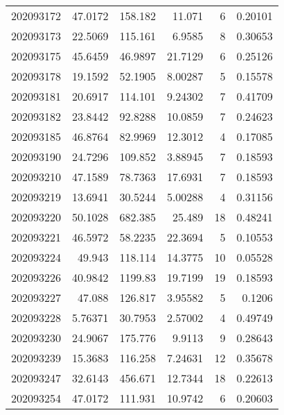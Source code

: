 \begin{tabular}{rrrrrr}
 202093172 &         47.0172  &      158.182  &           11.071   &           6 & 0.20101 \\
 202093173 &         22.5069  &      115.161  &            6.9585  &           8 & 0.30653 \\
 202093175 &         45.6459  &       46.9897 &           21.7129  &           6 & 0.25126 \\
 202093178 &         19.1592  &       52.1905 &            8.00287 &           5 & 0.15578 \\
 202093181 &         20.6917  &      114.101  &            9.24302 &           7 & 0.41709 \\
 202093182 &         23.8442  &       92.8288 &           10.0859  &           7 & 0.24623 \\
 202093185 &         46.8764  &       82.9969 &           12.3012  &           4 & 0.17085 \\
 202093190 &         24.7296  &      109.852  &            3.88945 &           7 & 0.18593 \\
 202093210 &         47.1589  &       78.7363 &           17.6931  &           7 & 0.18593 \\
 202093219 &         13.6941  &       30.5244 &            5.00288 &           4 & 0.31156 \\
 202093220 &         50.1028  &      682.385  &           25.489   &          18 & 0.48241 \\
 202093221 &         46.5972  &       58.2235 &           22.3694  &           5 & 0.10553 \\
 202093224 &         49.943   &      118.114  &           14.3775  &          10 & 0.05528 \\
 202093226 &         40.9842  &     1199.83   &           19.7199  &          19 & 0.18593 \\
 202093227 &         47.088   &      126.817  &            3.95582 &           5 & 0.1206  \\
 202093228 &          5.76371 &       30.7953 &            2.57002 &           4 & 0.49749 \\
 202093230 &         24.9067  &      175.776  &            9.9113  &           9 & 0.28643 \\
 202093239 &         15.3683  &      116.258  &            7.24631 &          12 & 0.35678 \\
 202093247 &         32.6143  &      456.671  &           12.7344  &          18 & 0.22613 \\
 202093254 &         47.0172  &      111.931  &           10.9742  &           6 & 0.20603 \\

\end{tabular}
